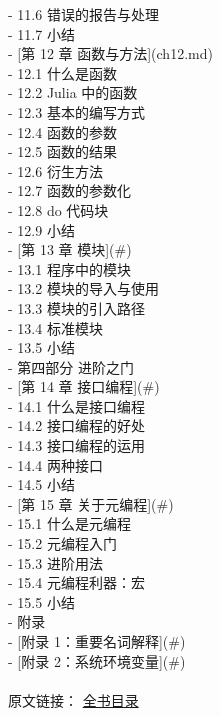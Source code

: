         - 11.6 错误的报告与处理 \\
        - 11.7 小结 \\
    - [第 12 章 函数与方法](ch12.md) \\
        - 12.1 什么是函数 \\
        - 12.2 Julia 中的函数 \\
        - 12.3 基本的编写方式 \\
        - 12.4 函数的参数 \\
        - 12.5 函数的结果 \\
        - 12.6 衍生方法 \\
        - 12.7 函数的参数化 \\
        - 12.8 do 代码块 \\
        - 12.9 小结  \\
    - [第 13 章 模块](#) \\
        - 13.1 程序中的模块 \\
        - 13.2 模块的导入与使用 \\
        - 13.3 模块的引入路径 \\
        - 13.4 标准模块 \\
        - 13.5 小结 \\
- 第四部分 进阶之门 \\
    - [第 14 章 接口编程](#) \\
        - 14.1 什么是接口编程 \\
        - 14.2 接口编程的好处 \\
        - 14.3 接口编程的运用 \\
        - 14.4 两种接口 \\
        - 14.5 小结 \\
    - [第 15 章 关于元编程](#) \\
        - 15.1 什么是元编程 \\
        - 15.2 元编程入门 \\
        - 15.3 进阶用法 \\
        - 15.4 元编程利器：宏 \\
        - 15.5 小结 \\
- 附录 \\
    - [附录 1：重要名词解释](#) \\
    - [附录 2：系统环境变量](#) \\
 \\


原文链接： \href{https://github.com/hyper0x/JuliaBasics/blob/master/book/CATALOG.md}{全书目录}
